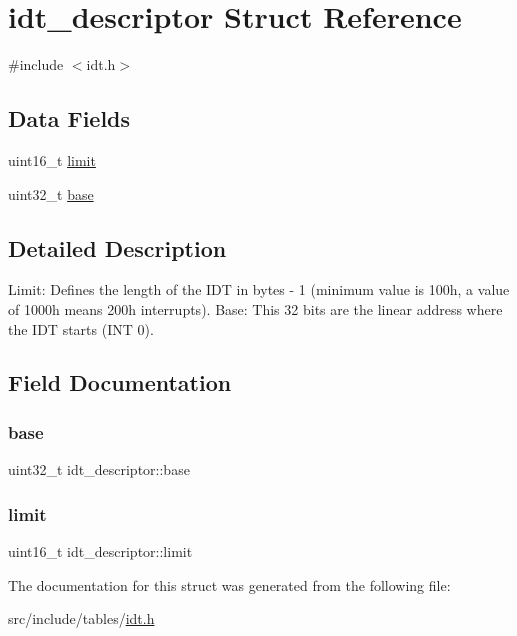 \hypertarget{structidt__descriptor}{}\section{idt\+\_\+descriptor Struct Reference}
\label{structidt__descriptor}


{\ttfamily \#include $<$idt.\+h$>$}

\subsection*{Data Fields}
\begin{DoxyCompactItemize}
\item 
uint16\+\_\+t \hyperlink{structidt__descriptor_a3a0538e960738d1ebe133b5d4fb50211}{limit}
\item 
uint32\+\_\+t \hyperlink{structidt__descriptor_a915c7ab831d163c1d42c2ca516f9d618}{base}
\end{DoxyCompactItemize}


\subsection{Detailed Description}
Limit\+: Defines the length of the I\+DT in bytes -\/ 1 (minimum value is 100h, a value of 1000h means 200h interrupts). Base\+: This 32 bits are the linear address where the I\+DT starts (I\+NT 0). 

\subsection{Field Documentation}
\mbox{\label{structidt__descriptor_a915c7ab831d163c1d42c2ca516f9d618}} 
\subsubsection{\texorpdfstring{base}{base}}
{\footnotesize\ttfamily uint32\+\_\+t idt\+\_\+descriptor\+::base}

\mbox{\label{structidt__descriptor_a3a0538e960738d1ebe133b5d4fb50211}} 
\subsubsection{\texorpdfstring{limit}{limit}}
{\footnotesize\ttfamily uint16\+\_\+t idt\+\_\+descriptor\+::limit}



The documentation for this struct was generated from the following file\+:\begin{DoxyCompactItemize}
\item 
src/include/tables/\hyperlink{idt_8h}{idt.\+h}\end{DoxyCompactItemize}
